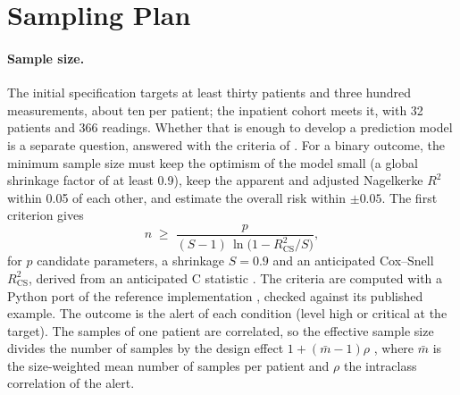 
\section{Sampling Plan}\label{sec:sampling}

\paragraph{Sample size.} The initial specification targets at least thirty patients and three hundred measurements, about ten per patient; the inpatient cohort meets it, with 32 patients and 366 readings. Whether that is enough to develop a prediction model is a separate question, answered with the criteria of \textcite{riley2019partII,riley2020bmj}. For a binary outcome, the minimum sample size must keep the optimism of the model small (a global shrinkage factor of at least 0.9), keep the apparent and adjusted Nagelkerke $R^2$ within 0.05 of each other, and estimate the overall risk within $\pm 0.05$. The first criterion gives
\begin{equation}
  n \;\geq\; \frac{p}{(S - 1)\,\ln\!\bigl(1 - R^2_{\mathrm{CS}}/S\bigr)},
\end{equation}
for $p$ candidate parameters, a shrinkage $S = 0.9$ and an anticipated Cox--Snell $R^2_{\mathrm{CS}}$, derived from an anticipated C statistic \parencite{riley2021cstat}. The criteria are computed with a Python port of the reference implementation \parencite{pmsampsize}, checked against its published example. The outcome is the alert of each condition (level high or critical at the target). The samples of one patient are correlated, so the effective sample size divides the number of samples by the design effect $1 + (\bar m - 1)\rho$ \parencite{kish1965}, where $\bar m$ is the size-weighted mean number of samples per patient and $\rho$ the intraclass correlation of the alert.

